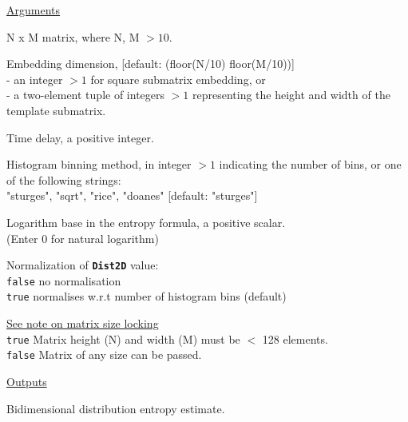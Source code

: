 \documentclass[12pt, a4paper, titlepage, openany]{book}
\begin{document}
\noindent \ul{Arguments}
\begin{description}[labelsep=1cm, labelwidth=2cm, nosep,,style=multiline,leftmargin=3cm]\footnotesize
\item[\texttt{Mat}]		N x M matrix,  where N, M $> 10$.
\item[\texttt{m}]		Embedding dimension, [default: (floor(N/10) floor(M/10))]\\
						- an integer $> 1$ for square submatrix embedding, or\\
						- a two-element tuple of integers $> 1$ representing the height and width of the template submatrix.
\item[\texttt{tau}]		Time delay, a positive integer.
\item[\texttt{Bins}]	Histogram binning method, in integer $> 1$ indicating the number of bins, 
						or one of the following strings:\\
   					    "sturges", "sqrt", "rice", "doanes" \hspace{2em} [default: "sturges"]
\item[\texttt{Logx}]	Logarithm base in the entropy formula, a positive scalar.\\
						(Enter 0 for natural logarithm)
\item[\texttt{Norm}]	Normalization of \texttt{\textbf{Dist2D}} value:\\
		  \texttt{false} \hspace{10pt} no normalisation \\
		  \texttt{true} \hspace{15pt} normalises w.r.t number of histogram bins (default)
\item[\texttt{Lock}]	\hyperlink{bidinote}{\ul{See note on matrix size locking}}\\
		  \texttt{true} \hspace{15pt} Matrix height (N) and width (M) must be $<$ 128 elements.\\
		  \texttt{false}\hspace{12pt} Matrix of any size can be passed.\\ 
\end{description}

\noindent \ul{Outputs}
\begin{description}[labelsep=1cm, labelwidth=2cm, nosep, style=multiline,leftmargin=3cm]\footnotesize
\item[\texttt{Dist2D}]		Bidimensional distribution entropy estimate.
\end{description}
\end{document}
